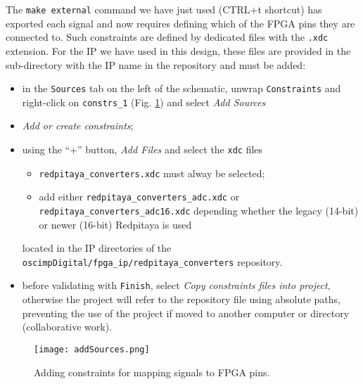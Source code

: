 \documentclass[10pt,oneside]{article}
\begin{document}
The {\tt make external} command we have just used (CTRL+t shortcut) has exported
each signal and now requires defining which of the FPGA pins they are connected to.
Such constraints are defined by dedicated files with the {\tt .xdc} extension. For the
IP we have used in this design, these files are provided in the sub-directory with the
IP name in the repository and must be added:
\begin{itemize}
\item in the {\tt Sources} tab on the left of the schematic, unwrap {\tt Constraints} 
and right-click on {\tt constrs\_1} (Fig. \ref{addSources}) and select {\em Add Sources}
\item {\em Add or create constraints};
\item using the ``+'' button, {\em Add Files} and select the {\tt xdc} files
	\begin{itemize}
\item {\tt redpitaya\_converters.xdc} must alway be selected;
\item add either {\tt redpitaya\_converters\_adc.xdc} or {\tt redpitaya\_converters\_adc16.xdc} 
depending whether the legacy (14-bit) or newer (16-bit) Redpitaya is used 
	\end{itemize}
located in the IP directories of the {\tt oscimpDigital/fpga\_ip/redpitaya\_converters} repository.
\item before validating with {\tt Finish}, select {\em Copy constraints
files into project}, otherwise the project will refer to the repository file
using absolute paths, preventing the use of the project if moved to another
computer or directory (collaborative work).
\end{itemize}

\begin{figure}[h!tb]
\begin{center}
\texttt{[image: addSources.png]}
\end{center}
\caption{Adding constraints for mapping signals to FPGA pins.}
\label{addSources}
\end{figure}
\end{document}
